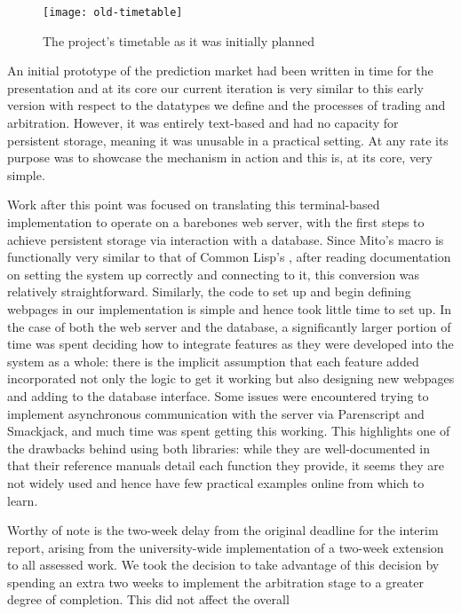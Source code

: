 \begin{figure}[h]
	\centering
	\texttt{[image: old-timetable]}
	\caption{The project's timetable as it was initially planned}
	\label{fig:old-timetable}
\end{figure}

An initial prototype of the prediction market had been written in time for the
presentation and at its core our current iteration is very similar to this
early version with respect to the datatypes we define and the processes of
trading and arbitration. However, it was entirely text-based and had no
capacity for persistent storage, meaning it was unusable in a practical
setting. At any rate its purpose was to showcase the mechanism in action and
this is, at its core, very simple. 

Work after this point was focused on translating this terminal-based
implementation to operate on a barebones web server, with the first steps to
achieve persistent storage via interaction with a database. Since Mito's
 macro is functionally very similar to that of Common Lisp's
, after reading documentation on setting the system up
correctly and connecting to it, this conversion was relatively straightforward.
Similarly, the code to set up and begin defining webpages in our implementation
is simple and hence took little time to set up. In the case of both the web
server and the database, a significantly larger portion of time was spent
deciding how to integrate features as they were developed into the system as a
whole: there is the implicit assumption that each feature added incorporated
not only the logic to get it working but also designing new webpages and adding
to the database interface. Some issues were encountered trying to implement
asynchronous communication with the server via Parenscript and Smackjack, and
much time was spent getting this working. This highlights one of the drawbacks
behind using both libraries: while they are well-documented in that their
reference manuals detail each function they provide, it seems they are not
widely used and hence have few practical examples online from which to learn.

Worthy of note is the two-week delay from the original deadline for the interim
report, arising from the university-wide implementation of a two-week extension
to all assessed work. We took the decision to take advantage of this decision
by spending an extra two weeks to implement the arbitration stage to a greater
degree of completion. This did not affect the overall

